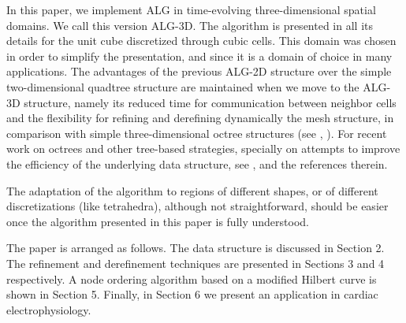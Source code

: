In this paper, we implement ALG in time-evolving three-dimensional spatial domains. We call this version ALG-3D.
The algorithm is presented in all its details for the unit
cube discretized through cubic cells. This domain was chosen in order to simplify
the presentation, and since it is a domain of choice in many applications.
The advantages of the previous ALG-2D structure over the simple two-dimensional quadtree structure are maintained when we move to the ALG-3D structure, namely its reduced time for communication between neighbor cells and the flexibility for refining and derefining dynamically the mesh structure, in comparison with simple three-dimensional octree structures (see \cite{Afthomis}, \cite{Khokhlov}). For recent work on octrees and other tree-based strategies, specially on attempts to improve the efficiency of the underlying data structure, see \cite{Bangerth2010}, and the references therein.

 The adaptation of the algorithm to regions of different shapes, or of different discretizations
(like tetrahedra), although not straightforward, should be easier once the algorithm
presented in this paper is fully understood.

The paper is arranged as follows. The data structure is discussed in Section 2. The refinement and derefinement techniques are presented in Sections 3 and 4 respectively. A node ordering algorithm based on a modified Hilbert curve is shown in Section 5. Finally, in Section 6 we present an application in cardiac electrophysiology.
